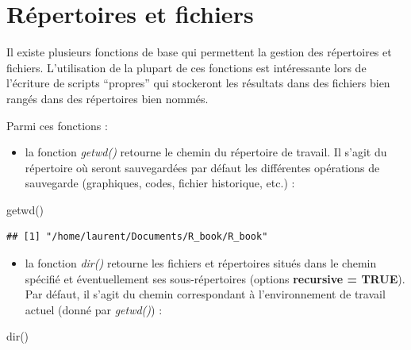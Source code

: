 \documentclass[
]{book}
\newenvironment{Shaded}{\begin{snugshade}}{\end{snugshade}}
\newcommand{\FunctionTok}[1]{\textcolor[rgb]{0.00,0.00,0.00}{#1}}
\newcommand{\NormalTok}[1]{#1}
\providecommand{\tightlist}{%
  \setlength{\itemsep}{0pt}\setlength{\parskip}{0pt}}
\theoremstyle{definition}
\theoremstyle{definition}
\theoremstyle{definition}
\theoremstyle{definition}
\theoremstyle{remark}
\begin{document}
\hypertarget{ruxe9pertoires-et-fichiers}{%
\section{Répertoires et fichiers}\label{ruxe9pertoires-et-fichiers}}

Il existe plusieurs fonctions de base qui permettent la gestion des répertoires et fichiers. L'utilisation de la plupart de ces fonctions est intéressante lors de l'écriture de scripts ``propres'' qui stockeront les résultats dans des fichiers bien rangés dans des répertoires bien nommés.

Parmi ces fonctions :

\begin{itemize}
\tightlist
\item
  la fonction \emph{getwd()} retourne le chemin du répertoire de travail. Il s'agit du répertoire où seront sauvegardées par défaut les différentes opérations de sauvegarde (graphiques, codes, fichier historique, etc.) :
\end{itemize}

\begin{Shaded}
\begin{Highlighting}[]
\FunctionTok{getwd}\NormalTok{()}
\end{Highlighting}
\end{Shaded}

\begin{verbatim}
## [1] "/home/laurent/Documents/R_book/R_book"
\end{verbatim}

\begin{itemize}
\tightlist
\item
  la fonction \emph{dir()} retourne les fichiers et répertoires situés dans le chemin spécifié et éventuellement ses sous-répertoires (options \textbf{recursive = TRUE}). Par défaut, il s'agit du chemin correspondant à l'environnement de travail actuel (donné par \emph{getwd()}) :
\end{itemize}

\begin{Shaded}
\begin{Highlighting}[]
\FunctionTok{dir}\NormalTok{()}
\end{Highlighting}
\end{Shaded}
\end{document}
